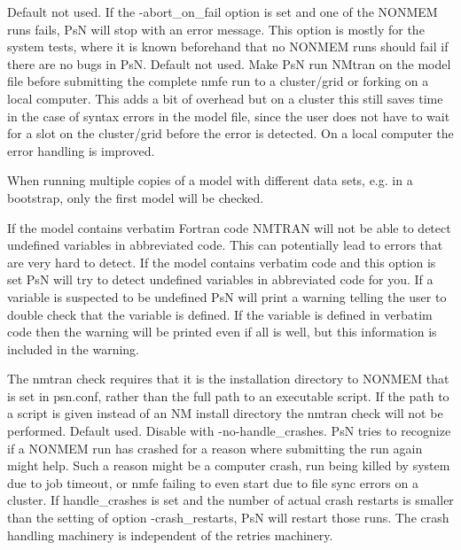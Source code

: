 \begin{optionlist}
Default not used. If the -abort\_on\_fail option is set and one of the NONMEM runs
fails, PsN will stop with an error message. This option
is mostly for the system tests, where it is known beforehand that no
NONMEM runs should fail if there are no bugs in PsN.
\nextopt
{}
Default not used. 
Make PsN run NMtran on the model file before submitting the complete nmfe run to a cluster/grid or forking on a local computer. This adds a bit of overhead but on a cluster this still saves time in the case of syntax errors in the model file, since the user does not have to wait for a slot on the cluster/grid before the error is detected. On a local computer the error handling is improved.

When running multiple copies of a model with different data sets, e.g. in a bootstrap, only the first model will be checked. 

If the model contains verbatim Fortran code NMTRAN will not be able to detect undefined variables in abbreviated code. This can potentially lead to
    errors that are very hard to detect. If the model contains verbatim code and this option is set PsN will try to detect
undefined variables in abbreviated code for you. If a variable is suspected to be undefined PsN will print a warning telling the user to double check that the variable is defined. If the variable is defined in verbatim code then the warning will be printed even 
if all is well, but this information is included in the warning. 

The nmtran check requires that it is the installation directory to NONMEM that is set in psn.conf, rather than the full path to an executable script. If the path to a script is given instead of an NM install directory the nmtran check will not be performed.
\nextopt
{}
Default used. Disable with -no-handle\_crashes. PsN tries to recognize if a NONMEM run has crashed for
a reason where submitting the run again might help. Such a reason might be
a computer crash, run being killed by system due to job timeout, or nmfe failing to even start due to file sync errors on a cluster.
If handle\_crashes is set and the number of actual crash restarts is smaller than the setting of option
-crash\_restarts, PsN will restart those runs. The crash handling machinery is independent of the retries machinery.


\end{optionlist}
